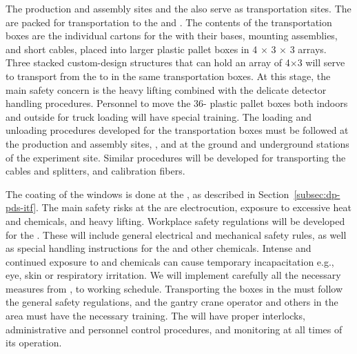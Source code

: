 The production and assembly sites and the  also serve as transportation sites. The  are packed for transportation to the  and . The contents of the transportation boxes are the individual cartons for the  with their bases, mounting assemblies, and short cables, placed into larger plastic pallet boxes in \num{4} $\times$ \num{3} $\times$ \num{3} arrays. %
Three stacked custom-design structures that can hold an array of 4$\times$3
  will serve to transport   from the   to  in the same transportation boxes. 
At this stage, the main safety concern is the heavy lifting combined with the delicate detector handling procedures. 
Personnel to move the \num{36}- plastic pallet boxes both indoors and outside for truck loading will have special training. The loading and unloading procedures developed for the  transportation boxes must be followed at the production and assembly sites, , and at the ground and underground stations of the experiment site. Similar procedures will be developed for transporting the  cables and splitters, and calibration fibers.

The  coating of the  windows is done at the , as described in Section~\ref{subsec:dp-pds-itf}. %
The main safety risks at the  are electrocution, exposure to excessive heat and chemicals, and heavy lifting. Workplace safety regulations will be developed for the . These will include general electrical and mechanical safety rules, as well as special handling instructions for the  and other chemicals. Intense and continued exposure to  and chemicals can cause temporary incapacitation e.g., eye, skin or respiratory irritation. We will implement carefully all the necessary measures from , to working schedule. %
Transporting the  boxes in the  must follow the general safety regulations, and the gantry crane operator and others in the area must have the necessary training. The  will have proper interlocks, administrative and personnel control procedures, and monitoring at all times of its operation.

